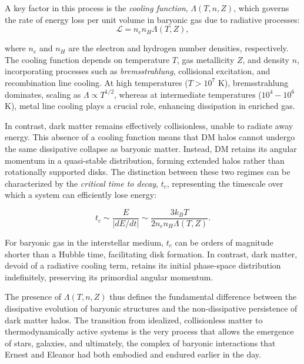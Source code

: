 A key factor in this process is the \textit{cooling function}, $\Lambda(T, n, Z)$, which governs the rate of energy loss per unit volume in baryonic gas due to radiative processes:
\begin{equation*}
    \mathcal{L} = n_e n_H \Lambda(T, Z),
\end{equation*}

where $n_e$ and $n_H$ are the electron and hydrogen number densities, respectively. The cooling function depends on temperature $T$, gas metallicity $Z$, and density $n$, incorporating processes such as \textit{bremsstrahlung}, collisional excitation, and recombination line cooling. At high temperatures ($T > 10^7$ K), bremsstrahlung dominates, scaling as $\Lambda \propto T^{1/2}$, whereas at intermediate temperatures ($10^4 - 10^6$ K), metal line cooling plays a crucial role, enhancing dissipation in enriched gas. 

In contrast, dark matter remains effectively collisionless, unable to radiate away energy. This absence of a cooling function means that DM halos cannot undergo the same dissipative collapse as baryonic matter. Instead, DM retains its angular momentum in a quasi-stable distribution, forming extended halos rather than rotationally supported disks. The distinction between these two regimes can be characterized by the \textit{critical time to decay}, $t_c$, representing the timescale over which a system can efficiently lose energy:

\begin{equation*}
    t_c \sim \frac{E}{|dE/dt|} \sim \frac{3 k_B T}{2 n_e n_H \Lambda(T, Z)}.
\end{equation*}

For baryonic gas in the interstellar medium, $t_c$ can be orders of magnitude shorter than a Hubble time, facilitating disk formation. In contrast, dark matter, devoid of a radiative cooling term, retains its initial phase-space distribution indefinitely, preserving its primordial angular momentum.

The presence of $\Lambda(T, n, Z)$ thus defines the fundamental difference between the dissipative evolution of baryonic structures and the non-dissipative persistence of dark matter halos. The transition from idealized, collisionless matter to thermodynamically active systems is the very process that allows the emergence of stars, galaxies, and ultimately, the complex of baryonic interactions that Ernest and Eleanor had both embodied and endured earlier in the day.









